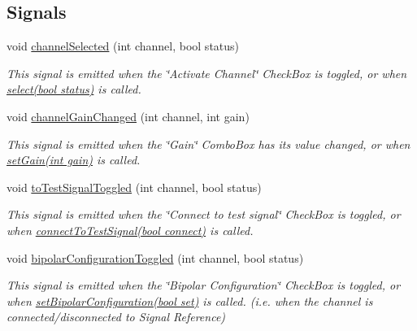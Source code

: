 \subsection*{Signals}
\begin{DoxyCompactItemize}
\item 
void \hyperlink{classChannelLayout_a2a9870b08695ba89559f5fc29628d018}{channel\+Selected} (int channel, bool status)
\begin{DoxyCompactList}\small\item\em This signal is emitted when the \char`\"{}\+Activate Channel\char`\"{} Check\+Box is toggled, or when \hyperlink{classChannelLayout_a9a030de719c4df6b68a0dcb5ea733f0e}{select(bool status)} is called. \end{DoxyCompactList}\item 
void \hyperlink{classChannelLayout_a12fa160d0f7b87c66d0e08e6f0abc996}{channel\+Gain\+Changed} (int channel, int gain)
\begin{DoxyCompactList}\small\item\em This signal is emitted when the \char`\"{}\+Gain\char`\"{} Combo\+Box has its value changed, or when \hyperlink{classChannelLayout_a79f01917e46190d8e7e1cfaeb66b5334}{set\+Gain(int gain)} is called. \end{DoxyCompactList}\item 
void \hyperlink{classChannelLayout_ac515619c820628a614d25802f7ebde23}{to\+Test\+Signal\+Toggled} (int channel, bool status)
\begin{DoxyCompactList}\small\item\em This signal is emitted when the \char`\"{}\+Connect to test signal\char`\"{} Check\+Box is toggled, or when \hyperlink{classChannelLayout_a05f0a5b58375512683943c5aa92dc75c}{connect\+To\+Test\+Signal(bool connect)} is called. \end{DoxyCompactList}\item 
void \hyperlink{classChannelLayout_a3e4ce867e174d9ec8533f17b43247c0f}{bipolar\+Configuration\+Toggled} (int channel, bool status)
\begin{DoxyCompactList}\small\item\em This signal is emitted when the \char`\"{}\+Bipolar Configuration\char`\"{} Check\+Box is toggled, or when \hyperlink{classChannelLayout_a84a2f0c9aa038d4863486b975868bed3}{set\+Bipolar\+Configuration(bool set)} is called. (i.\+e. when the channel is connected/disconnected to Signal Reference) \end{DoxyCompactList}\end{DoxyCompactItemize}
